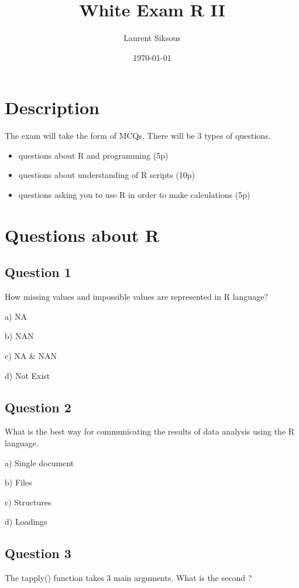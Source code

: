 \documentclass[11pt]{article}
\author{Laurent Siksous}
\date{\today}
\title{White Exam R II}
\begin{document}
\maketitle

\section*{Description}
\label{sec:orga4a4939}
The exam will take the form of MCQs. There will be 3 types of questions.

\begin{itemize}
\item questions about R and programming (5p)

\item questions about understanding of R scripts (10p)

\item questions asking you to use R in order to make calculations (5p)
\end{itemize}

\section*{Questions about R}
\label{sec:org1857021}
\subsection*{Question 1}
\label{sec:org1591f8f}
How missing values and impossible values are represented in R language?

a) NA

b) NAN

c) NA \& NAN

d) Not Exist

\subsection*{Question 2}
\label{sec:orgdd1754a}
What is the best way for communicating the results of data analysis using the R language.

a) Single document

b) Files

c) Structures

d) Loadings

\subsection*{Question 3}
\label{sec:org1e9d88f}
The tapply() function takes 3 main arguments. What is the second ?
\end{document}
